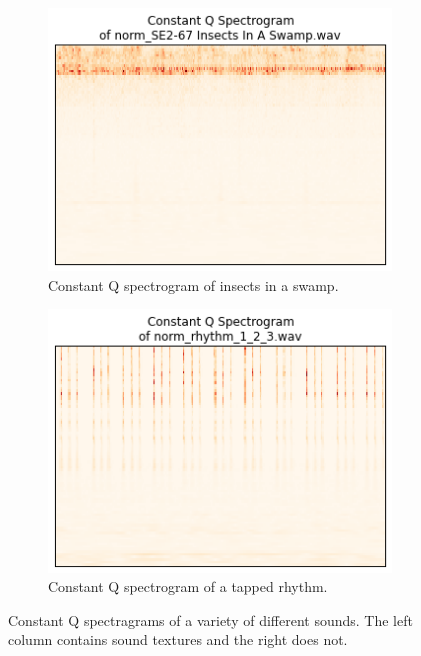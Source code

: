 \documentclass{sig-alternate-05-2015}
\begin{document}
\begin{figure}[hbt]
\begin{subfigure}[b]{0.45\textwidth}
      \centering
      \includegraphics[width=\textwidth]{figures/cqt_insects.png}
      \caption{Constant Q spectrogram of insects in a swamp.}
      \label{fig:cqt-applause}
    \end{subfigure}
    \hfill 
    \begin{subfigure}[b]{0.45\textwidth}
      \centering
      \includegraphics[width=\textwidth]{figures/cqt_rythm123.png}
      \caption{Constant Q spectrogram of a tapped rhythm.}
      \label{fig:cqt-applause}
    \end{subfigure}
    \caption{Constant Q spectragrams of a variety of different sounds. The left column contains sound textures and the right does not.}
    \label{fig:spectrograms}
  \end{figure}
\end{document}
